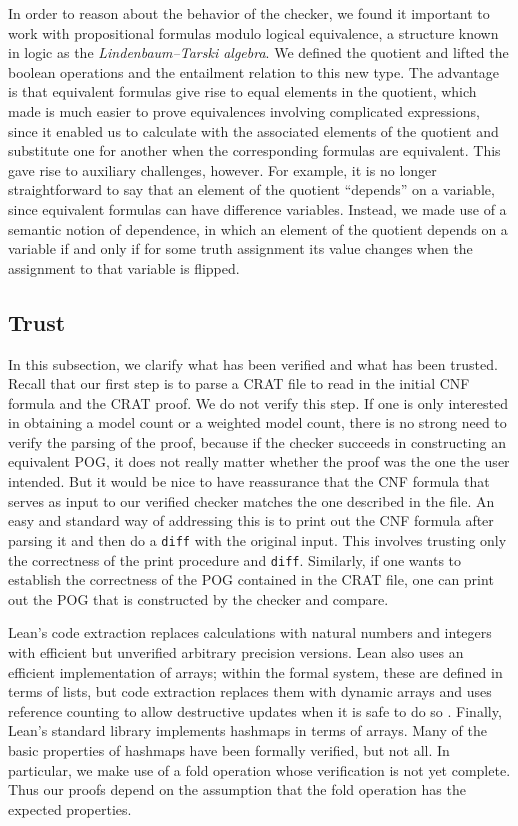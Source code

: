 In order to reason about the behavior of the checker, we found it important to work
with propositional formulas modulo logical equivalence, a structure known in logic
as the \emph{Lindenbaum--Tarski algebra}.
We defined the quotient and lifted the boolean operations and the entailment
relation to this new type. The advantage is that equivalent formulas give
rise to equal elements in the quotient, which
made is much easier to prove equivalences involving complicated expressions,
since it enabled us to calculate with the associated
elements of the quotient and substitute one for another when the corresponding formulas are equivalent. This gave rise to auxiliary challenges, however.
For example, it is no longer straightforward to say that an element of the quotient ``depends'' on a variable,
since equivalent formulas can have difference variables.
Instead, we made use of a semantic notion of dependence, in which an element of the
quotient depends on a variable if and only if for some truth assignment its value
changes when the assignment to that variable is flipped.

\subsection{Trust}

In this subsection, we clarify what has been verified and what has been trusted.
Recall that our first step is to parse a CRAT file to read in the initial CNF formula
and the CRAT proof. We do not verify this step.
If one is only interested in obtaining a model count or a weighted model count,
there is no strong need to verify the parsing of the proof,
because if the checker succeeds in constructing an equivalent POG,
it does not really matter whether the proof was the one the user intended.
But it would be nice to have reassurance that the CNF formula that serves
as input to our verified checker matches the one described in the file.
An easy and standard way of addressing this is to print out the CNF formula
after parsing it and then do a {\tt diff} with the original input.
This involves trusting only the correctness of the print procedure and {\tt diff}.
Similarly, if one wants to establish the correctness of the POG contained in the CRAT file,
one can print out the POG that is constructed by the checker and compare.

Lean's code extraction replaces calculations with natural numbers and integers with
efficient but unverified arbitrary precision versions.
Lean also uses an efficient implementation of arrays; within the
formal system, these are defined in terms of lists, but code extraction replaces them
with dynamic arrays and uses reference counting to allow destructive updates when it is safe
to do so \cite{Ullrich:de:Moura:19}.
Finally, Lean's standard library implements hashmaps in terms of arrays.
Many of the basic properties of hashmaps have been formally verified, but not all.
In particular, we make use of a fold operation whose verification is not yet complete.
Thus our proofs depend on the assumption that the fold operation has the
expected properties.

